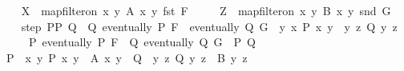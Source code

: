 \begin{isabellebody}
\ \ \isamarkupfalse%
\ {\isacharquery}{\kern0pt}X\ {\isacharequal}{\kern0pt}\ {\isachardoublequoteopen}map{\isacharunderscore}{\kern0pt}filter{\isacharunderscore}{\kern0pt}on\ {\isacharbraceleft}{\kern0pt}{\isacharparenleft}{\kern0pt}x{\isacharcomma}{\kern0pt}\ y{\isacharparenright}{\kern0pt}{\isachardot}{\kern0pt}\ A\ x\ y{\isacharbraceright}{\kern0pt}\ fst\ F{\isachardoublequoteclose}\isanewline
\ \ \ \ \ {\isacharquery}{\kern0pt}Z\ {\isacharequal}{\kern0pt}\ {\isachardoublequoteopen}{\isacharparenleft}{\kern0pt}map{\isacharunderscore}{\kern0pt}filter{\isacharunderscore}{\kern0pt}on\ {\isacharbraceleft}{\kern0pt}{\isacharparenleft}{\kern0pt}x{\isacharcomma}{\kern0pt}\ y{\isacharparenright}{\kern0pt}{\isachardot}{\kern0pt}\ B\ x\ y{\isacharbraceright}{\kern0pt}\ snd\ G{\isacharparenright}{\kern0pt}{\isachardoublequoteclose}\isanewline
\ \ \isamarkupfalse%
\ step{\isacharcolon}{\kern0pt}\ {\isachardoublequoteopen}{\isasymexists}P{\isacharprime}{\kern0pt}{\isasymle}P{\isachardot}{\kern0pt}\ {\isasymexists}Q{\isacharprime}{\kern0pt}\ {\isasymle}\ Q{\isachardot}{\kern0pt}\ eventually\ P{\isacharprime}{\kern0pt}\ F\ {\isasymand}\ eventually\ Q{\isacharprime}{\kern0pt}\ G\ {\isasymand}\ {\isacharbraceleft}{\kern0pt}y{\isachardot}{\kern0pt}\ {\isasymexists}x{\isachardot}{\kern0pt}\ P{\isacharprime}{\kern0pt}\ {\isacharparenleft}{\kern0pt}x{\isacharcomma}{\kern0pt}\ y{\isacharparenright}{\kern0pt}{\isacharbraceright}{\kern0pt}\ {\isacharequal}{\kern0pt}\ {\isacharbraceleft}{\kern0pt}y{\isachardot}{\kern0pt}\ {\isasymexists}z{\isachardot}{\kern0pt}\ Q{\isacharprime}{\kern0pt}\ {\isacharparenleft}{\kern0pt}y{\isacharcomma}{\kern0pt}\ z{\isacharparenright}{\kern0pt}{\isacharbraceright}{\kern0pt}{\isachardoublequoteclose}\isanewline
\ \ \ \ \ P{\isacharcolon}{\kern0pt}\ {\isachardoublequoteopen}eventually\ P\ F{\isachardoublequoteclose}\ \ Q{\isacharcolon}{\kern0pt}\ {\isachardoublequoteopen}eventually\ Q\ G{\isachardoublequoteclose}\ \ P\ Q\isanewline
\ \ \isamarkupfalse%
\ {\isacharminus}{\kern0pt}\isanewline
\ \ \ \ \isamarkupfalse%
\ {\isacharquery}{\kern0pt}P\ {\isacharequal}{\kern0pt}\ {\isachardoublequoteopen}{\isasymlambda}{\isacharparenleft}{\kern0pt}x{\isacharcomma}{\kern0pt}\ y{\isacharparenright}{\kern0pt}{\isachardot}{\kern0pt}\ P\ {\isacharparenleft}{\kern0pt}x{\isacharcomma}{\kern0pt}\ y{\isacharparenright}{\kern0pt}\ {\isasymand}\ A\ x\ y{\isachardoublequoteclose}\ \ {\isacharquery}{\kern0pt}Q\ {\isacharequal}{\kern0pt}\ {\isachardoublequoteopen}{\isasymlambda}{\isacharparenleft}{\kern0pt}y{\isacharcomma}{\kern0pt}\ z{\isacharparenright}{\kern0pt}{\isachardot}{\kern0pt}\ Q\ {\isacharparenleft}{\kern0pt}y{\isacharcomma}{\kern0pt}\ z{\isacharparenright}{\kern0pt}\ {\isasymand}\ B\ y\ z{\isachardoublequoteclose}\isanewline

\end{isabellebody}
